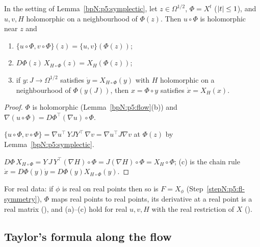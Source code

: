 \begin{corollary}\label{bpN:p5:canonical}
In the setting of Lemma~\ref{bpN:p5:symplectic}, let $z\in\Omega^{1/2}$, $\Phi=X^t$ ($\lvert t\rvert\le1$), and $u,v,H$ holomorphic on a neighbourhood of $\Phi(z)$. Then $u\circ\Phi$ is holomorphic near $z$ and
\begin{enumerate}[label=(\alph*)]
\item $\{u\circ\Phi,v\circ\Phi\}(z)=\{u,v\}(\Phi(z))$;
\item $D\Phi(z)\,X_{H\circ\Phi}(z)=X_H(\Phi(z))$;
\item if $y:J\to\Omega^{1/2}$ satisfies $\dot y=X_{H\circ\Phi}(y)$ with $H$ holomorphic on a neighbourhood of $\Phi(y(J))$, then $x=\Phi\circ y$ satisfies $\dot x=X_H(x)$.
\end{enumerate}
\end{corollary}
\begin{proof}
\label{stepN:p5:ca-chain} $\Phi$ is holomorphic (Lemma~\ref{bpN:p5:flow}(b)) and $\nabla(u\circ\Phi)=D\Phi^\top(\nabla u)\circ\Phi$.

\label{stepN:p5:ca-a} $\{u\circ\Phi,v\circ\Phi\}=\nabla u^\top\,Y J Y^\top\,\nabla v=\nabla u^\top J\nabla v$ at $\Phi(z)$ by Lemma~\ref{bpN:p5:symplectic}.

\label{stepN:p5:ca-b} $D\Phi\,X_{H\circ\Phi}=Y\,J\,Y^\top(\nabla H)\circ\Phi=J(\nabla H)\circ\Phi=X_H\circ\Phi$; (c) is the chain rule $\dot x=D\Phi(y)\dot y=D\Phi(y)X_{H\circ\Phi}(y)$.
\end{proof}
For real data: if $\phi$ is real on real points then so is $F=X_\phi$ (Step~\ref{stepN:p5:fl-symmetry}), $\Phi$ maps real points to real points, its derivative at a real point is a real matrix (), and (a)--(c) hold for real $u,v,H$ with the real restriction of $X$ ().

\subsection{Taylor's formula along the flow}\label{bpN:p5:s-taylor}

